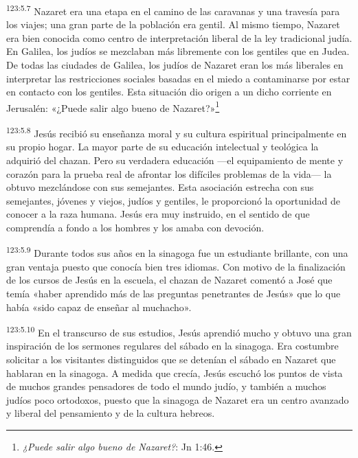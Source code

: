 \par 
\textsuperscript{123:5.7} Nazaret era una etapa en el camino de las caravanas y una travesía para los viajes; una gran parte de la población era gentil. Al mismo tiempo, Nazaret era bien conocida como centro de interpretación liberal de la ley tradicional judía. En Galilea, los judíos se mezclaban más libremente con los gentiles que en Judea. De todas las ciudades de Galilea, los judíos de Nazaret eran los más liberales en interpretar las restricciones sociales basadas en el miedo a contaminarse por estar en contacto con los gentiles. Esta situación dio origen a un dicho corriente en Jerusalén: «¿Puede salir algo bueno de Nazaret?»\footnote{\textit{¿Puede salir algo bueno de Nazaret?}: Jn 1:46.}

\par 
\textsuperscript{123:5.8} Jesús recibió su enseñanza moral y su cultura espiritual principalmente en su propio hogar. La mayor parte de su educación intelectual y teológica la adquirió del chazan. Pero su verdadera educación ---el equipamiento de mente y corazón para la prueba real de afrontar los difíciles problemas de la vida--- la obtuvo mezclándose con sus semejantes. Esta asociación estrecha con sus semejantes, jóvenes y viejos, judíos y gentiles, le proporcionó la oportunidad de conocer a la raza humana. Jesús era muy instruido, en el sentido de que comprendía a fondo a los hombres y los amaba con devoción.

\par 
\textsuperscript{123:5.9} Durante todos sus años en la sinagoga fue un estudiante brillante, con una gran ventaja puesto que conocía bien tres idiomas. Con motivo de la finalización de los cursos de Jesús en la escuela, el chazan de Nazaret comentó a José que temía «haber aprendido más de las preguntas penetrantes de Jesús» que lo que había «sido capaz de enseñar al muchacho».

\par 
\textsuperscript{123:5.10} En el transcurso de sus estudios, Jesús aprendió mucho y obtuvo una gran inspiración de los sermones regulares del sábado en la sinagoga. Era costumbre solicitar a los visitantes distinguidos que se detenían el sábado en Nazaret que hablaran en la sinagoga. A medida que crecía, Jesús escuchó los puntos de vista de muchos grandes pensadores de todo el mundo judío, y también a muchos judíos poco ortodoxos, puesto que la sinagoga de Nazaret era un centro avanzado y liberal del pensamiento y de la cultura hebreos.


